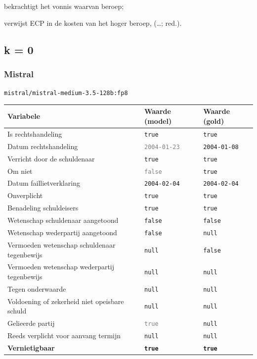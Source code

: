 \documentclass[
  dutch,
  a4paper,
]{article}
\begin{document}
bekrachtigt het vonnis waarvan beroep;

verwijst ECP in de kosten van het hoger beroep, (\ldots; red.).

\newpage


\subsection{k = 0}\label{k-0-5}

\subsubsection{Mistral}\label{mistral-15}

\texttt{mistral/mistral-medium-3.5-128b:fp8}

\begin{center}
\small
\begin{tabular}{@{}p{7.4cm}p{2.6cm}p{2.6cm}@{}}
\toprule
Variabele & Waarde (model) & Waarde (gold) \\
\midrule
Is rechtshandeling & \texttt{true} & \texttt{true} \\
Datum rechtshandeling & \textcolor{gray}{\texttt{2004-01-23}} & \texttt{2004-01-08} \\
Verricht door de schuldenaar & \texttt{true} & \texttt{true} \\
Om niet & \textcolor{gray}{\texttt{false}} & \texttt{true} \\
Datum faillietverklaring & \texttt{2004-02-04} & \texttt{2004-02-04} \\
Onverplicht & \texttt{true} & \texttt{true} \\
Benadeling schuldeisers & \texttt{true} & \texttt{true} \\
Wetenschap schuldenaar aangetoond & \texttt{false} & \texttt{false} \\
Wetenschap wederpartij aangetoond & \texttt{false} & \texttt{null} \\
Vermoeden wetenschap schuldenaar tegenbewijs & \texttt{null} & \texttt{false} \\
Vermoeden wetenschap wederpartij tegenbewijs & \texttt{null} & \texttt{null} \\
Tegen onderwaarde & \texttt{null} & \texttt{null} \\
Voldoening of zekerheid niet opeisbare schuld & \texttt{null} & \texttt{null} \\
Gelieerde partij & \textcolor{gray}{\texttt{true}} & \texttt{null} \\
Reeds verplicht voor aanvang termijn & \texttt{null} & \texttt{null} \\
\textbf{Vernietigbaar} & \textbf{\texttt{true}} & \textbf{\texttt{true}} \\
\bottomrule
\end{tabular}
\end{center}
\end{document}
